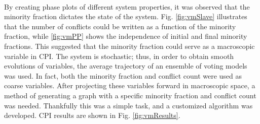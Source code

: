 \documentclass[11pt]{article}
\begin{document}
\\
\indent By creating phase plots of different system properties, it was observed that the minority fraction dictates the state of the system. Fig. \ref{fig:vmSlave} illustrates that the number of conflicts could be written as a function of the minority fraction, while \ref{fig:vmPP} shows the independence of initial and final minority fractions. This suggested that the minority fraction could serve as a macroscopic variable in CPI. The system is stochastic; thus,  in order to obtain smooth evolutions of variables, the average trajectory of an ensemble of voting models was used. In fact, both the minority fraction and conflict count were used as coarse variables. After projecting these variables forward in macroscopic space, a method of generating a graph with a specific minority fraction and conflict count was needed. Thankfully this was a simple task, and a customized algorithm was developed. CPI results are shown in Fig. \ref{fig:vmResults}.\\
\end{document}
